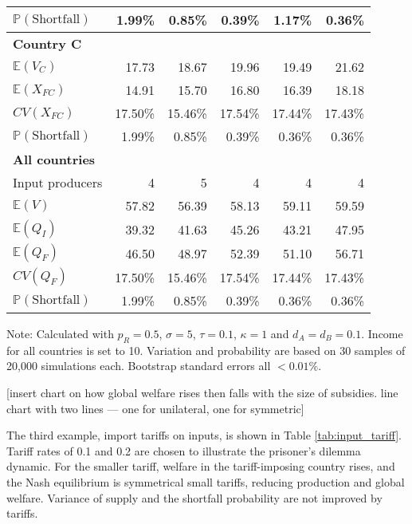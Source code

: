 \documentclass{article}
\begin{document}
\begin{table}
\begin{threeparttable}
\begin{tabular}{lrrrrr}
            $\mathbb{P}(\text{Shortfall})$ & 1.99\% & 0.85\% & 0.39\% & 1.17\% & 0.36\% \\ 
            \midrule
            \textbf{Country C} \\
            $\mathbb{E}(V_C)$ & 17.73 & 18.67 & 19.96 & 19.49 & 21.62 \\
            $\mathbb{E}(X_{FC})$ & 14.91 & 15.70 & 16.80 & 16.39 & 18.18 \\
            $CV(X_{FC})$ & 17.50\% & 15.46\% & 17.54\% & 17.44\% & 17.43\% \\
            $\mathbb{P}(\text{Shortfall})$ & 1.99\% & 0.85\% & 0.39\% & 0.36\% & 0.36\% \\ 
            \midrule
            \textbf{All countries} \\
            Input producers & 4 & 5 & 4 & 4 & 4 \\
            $\mathbb{E}(V)$ & 57.82 & 56.39 & 58.13 & 59.11 & 59.59 \\
            $\mathbb{E}(Q_{I})$ & 39.32 & 41.63 & 45.26 & 43.21 & 47.95 \\
            $\mathbb{E}(Q_{F})$ & 46.50 & 48.97 & 52.39 & 51.10 & 56.71 \\
            $CV(Q_{F})$ & 17.50\% & 15.46\% & 17.54\% & 17.44\% & 17.43\% \\
            $\mathbb{P}(\text{Shortfall})$ & 1.99\% & 0.85\% & 0.39\% & 0.36\% & 0.36\% \\ 
            \bottomrule
        \end{tabular}
        \begin{tablenotes}
            \small \item Note: Calculated with $p_R = 0.5$, $\sigma = 5$, $\tau = 0.1$, $\kappa = 1$ and $d_A = d_B = 0.1$. Income for all countries is set to 10. Variation and probability are based on 30 samples of 20,000 simulations each. Bootstrap standard errors all $<0.01\%$.
        \end{tablenotes}
    \end{threeparttable}
\end{table}

[insert chart on how global welfare rises then falls with the size of subsidies. line chart with two lines --- one for unilateral, one for symmetric]

The third example, import tariffs on inputs, is shown in Table \ref{tab:input_tariff}. Tariff rates of 0.1 and 0.2 are chosen to illustrate the prisoner's dilemma dynamic. For the smaller tariff, welfare in the tariff-imposing country rises, and the Nash equilibrium is symmetrical small tariffs, reducing production and global welfare. Variance of supply and the shortfall probability are not improved by tariffs.
\end{document}
